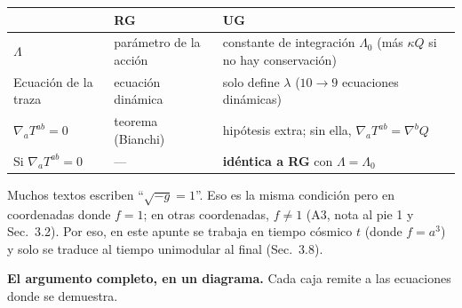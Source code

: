 \documentclass[11pt,a4paper]{article}
\newcommand{\sub}[2]{\par\medskip\noindent{\bfseries\color{NavyBlue}#1}\quad\textbf{#2}}
\begin{document}
\begin{center}\small
\renewcommand{\arraystretch}{1.3}
\begin{tabular}{@{}L{3.6cm}L{5.5cm}L{6cm}@{}}
\toprule
& \textbf{RG} & \textbf{UG}\\
\midrule
$\Lambda$ & parámetro de la acción & constante de integración $\Lambda_0$ (más $\kappa Q$ si no hay conservación)\\
Ecuación de la traza & ecuación dinámica & solo define $\lambda$ ($10\to9$ ecuaciones dinámicas)\\
$\nabla_aT^{ab}=0$ & teorema (Bianchi) & hipótesis extra; sin ella, $\nabla_aT^{ab}=\nabla^bQ$\\
Si $\nabla_aT^{ab}=0$ & --- & \textbf{idéntica a RG} con $\Lambda=\Lambda_0$\\
\bottomrule
\end{tabular}
\end{center}

\begin{ojo}[Ojo: $\sqrt{-g}=f$ no es $\sqrt{-g}=1$]
Muchos textos escriben ``$\sqrt{-g}=1$''. Eso es la misma condición pero en coordenadas donde $f=1$; en otras coordenadas, $f\neq1$ (A3, nota al pie 1 y Sec.~3.2). Por eso, en este apunte se trabaja en tiempo cósmico $t$ (donde $f=a^3$) y solo se traduce al tiempo unimodular al final (Sec.~3.8).
\end{ojo}

\sub{0.3}{El argumento completo, en un diagrama.} Cada caja remite a las ecuaciones donde se demuestra.
\end{document}
